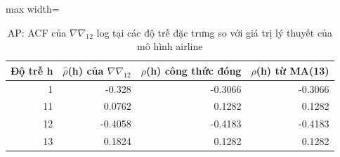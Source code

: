 \begin{table}[H]
\centering\footnotesize
\caption{AP: ACF của $\nabla\nabla_{12}$ log tại các độ trễ đặc trưng so với giá trị lý thuyết của mô hình airline}\label{tab:tab_b12_10_airline_acf}
\begin{adjustbox}{max width=\linewidth}
\begin{tabular}{|r|r|r|r|}
\toprule
Độ trễ h & $\hat{\rho}$(h) của $\nabla\nabla_{12}$ & $\rho$(h) công thức đóng & $\rho$(h) từ MA(13) \\
\midrule
1 & -0.328 & -0.3066 & -0.3066 \\
11 & 0.0762 & 0.1282 & 0.1282 \\
12 & -0.4058 & -0.4183 & -0.4183 \\
13 & 0.1824 & 0.1282 & 0.1282 \\
\bottomrule
\end{tabular}
\end{adjustbox}
\end{table}
